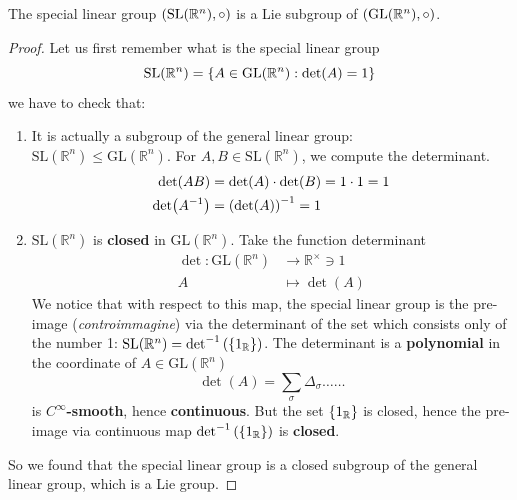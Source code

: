 \documentclass[../main.tex]{subfiles}
\begin{document}
\begin{corollary}
The special linear group $\pqty{\textrm{SL}(\mathbb{R}^n),\circ}$ is a Lie subgroup of $\pqty{\textrm{GL}(\mathbb{R}^n),\circ}$.
\end{corollary}
\begin{proof}
Let us first remember what is the special linear group
\[
\textrm{SL}(\mathbb{R}^n)=\Bqty{A\in \textrm{GL}(\mathbb{R}^n): \det(A)=1}
\]
we have to check that:
\begin{enumerate}
    \item It is actually a subgroup of the general linear group:\\ \(\textrm{SL}(\mathbb{R}^n)\leq \textrm{GL}(\mathbb{R}^n)\). For $A,B\in \textrm{SL}(\mathbb{R}^n)$, we compute the determinant.
    \[
    \begin{split}
    \det(AB)&=\det(A)\cdot\det(B)=1\cdot 1 = 1\\
    \det(A^{-1})&=\pqty{\det(A)}^{-1}=1
    \end{split}
    \]
    \item $\textrm{SL}(\mathbb{R}^n)$ is \textbf{closed} in $\textrm{GL}(\mathbb{R}^n)$. Take the function determinant
    \[
    \begin{split}
    \det : \textrm{GL}(\mathbb{R}^n)&\to \mathbb{R}^\times\ni 1\\
    A & \mapsto \det(A)
    \end{split}
    \]
    We notice that with respect to this map, the special linear group is the pre-image (\textit{controimmagine}) via the determinant of the set which consists only of the number 1: {\color{red}$\textrm{SL}(\mathbb{R}^n)=\det^{-1}\pqty{\Bqty{1_\mathbb{R}}}$}. The determinant is a \textbf{polynomial} in the coordinate of $A\in \textrm{GL}(\mathbb{R}^n)$
    \[
    \det(A)=\sum_\sigma\Delta_\sigma \dots \dots
    \]
    is $C^\infty$\textbf{-smooth}, hence \textbf{continuous}. But the set $\Bqty{1_{\mathbb{R}}}$ is closed, hence the pre-image via continuous map $\det^{-1}\pqty{\Bqty{1_{\mathbb{R}}}}$ is \textbf{closed}.
\end{enumerate}
So we found that the special linear group is a closed subgroup of the general linear group, which is a Lie group.
\end{proof}
\end{document}
